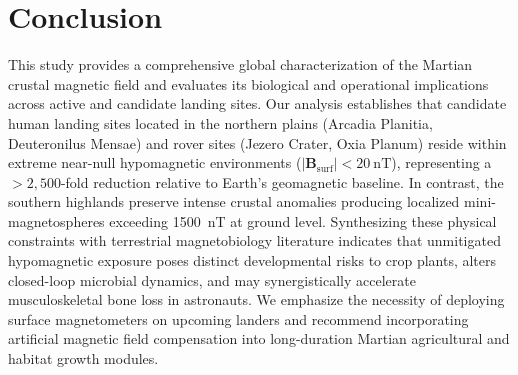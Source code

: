 \section{Conclusion}
\label{sec:conclusion}

This study provides a comprehensive global characterization of the Martian crustal magnetic field and evaluates its biological and operational implications across active and candidate landing sites. Our analysis establishes that candidate human landing sites located in the northern plains (Arcadia Planitia, Deuteronilus Mensae) and rover sites (Jezero Crater, Oxia Planum) reside within extreme near-null hypomagnetic environments ($|\mathbf{B}_{\text{surf}}| < \SI{20}{\nano\tesla}$), representing a $>2,500$-fold reduction relative to Earth's geomagnetic baseline. In contrast, the southern highlands preserve intense crustal anomalies producing localized mini-magnetospheres exceeding \SI{1500}{\nano\tesla} at ground level. Synthesizing these physical constraints with terrestrial magnetobiology literature indicates that unmitigated hypomagnetic exposure poses distinct developmental risks to crop plants, alters closed-loop microbial dynamics, and may synergistically accelerate musculoskeletal bone loss in astronauts. We emphasize the necessity of deploying surface magnetometers on upcoming landers and recommend incorporating artificial magnetic field compensation into long-duration Martian agricultural and habitat growth modules.
